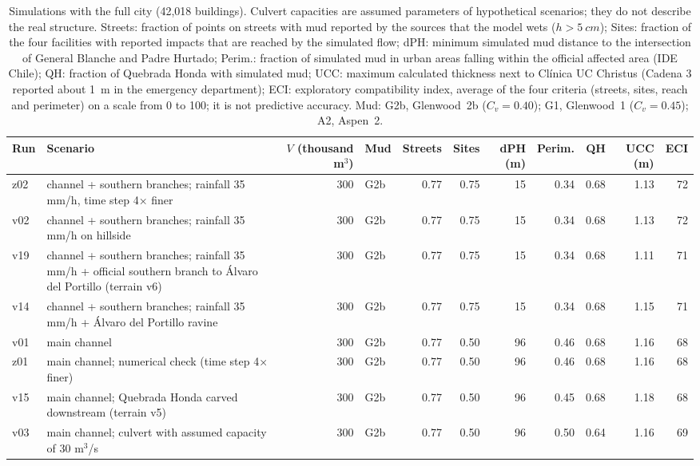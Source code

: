 \begin{table}[htbp]\centering\small
\caption{Simulations with the full city (42,018 buildings). Culvert capacities are assumed parameters of hypothetical scenarios; they do not describe the real structure. Streets: fraction of points on streets with mud reported by the sources that the model wets ($h>\SI{5}{cm}$); Sites: fraction of the four facilities with reported impacts that are reached by the simulated flow; dPH: minimum simulated mud distance to the intersection of General Blanche and Padre Hurtado; Perim.: fraction of simulated mud in urban areas falling within the official affected area (IDE Chile); QH: fraction of Quebrada Honda with simulated mud; UCC: maximum calculated thickness next to Clínica UC Christus (Cadena 3 reported about \SI{1}{m} in the emergency department); ECI: exploratory compatibility index, average of the four criteria (streets, sites, reach and perimeter) on a scale from 0 to 100; it is not predictive accuracy. Mud: G2b, Glenwood~2b ($C_v=0.40$); G1, Glenwood~1 ($C_v=0.45$); A2, Aspen~2.}\label{tab:v4}
{\setlength{\tabcolsep}{3.5pt}\begin{adjustbox}{max width=\textwidth}\begin{tabular}{llrlrrrrrrr}\toprule
Run & Scenario & $V$ (thousand m$^3$) & Mud & Streets & Sites & dPH (m) & Perim. & QH & UCC (m) & ECI\\
\midrule
z02 & channel + southern branches; rainfall 35 mm/h, time step 4× finer & 300 & G2b & 0.77 & 0.75 & 15 & 0.34 & 0.68 & 1.13 & 72\\
v02 & channel + southern branches; rainfall 35 mm/h on hillside & 300 & G2b & 0.77 & 0.75 & 15 & 0.34 & 0.68 & 1.13 & 72\\
v19 & channel + southern branches; rainfall 35 mm/h + official southern branch to Álvaro del Portillo (terrain v6) & 300 & G2b & 0.77 & 0.75 & 15 & 0.34 & 0.68 & 1.11 & 71\\
v14 & channel + southern branches; rainfall 35 mm/h + Álvaro del Portillo ravine & 300 & G2b & 0.77 & 0.75 & 15 & 0.34 & 0.68 & 1.15 & 71\\
v01 & main channel & 300 & G2b & 0.77 & 0.50 & 96 & 0.46 & 0.68 & 1.16 & 68\\
z01 & main channel; numerical check (time step 4× finer) & 300 & G2b & 0.77 & 0.50 & 96 & 0.46 & 0.68 & 1.16 & 68\\
v15 & main channel; Quebrada Honda carved downstream (terrain v5) & 300 & G2b & 0.77 & 0.50 & 96 & 0.45 & 0.68 & 1.18 & 68\\
v03 & main channel; culvert with assumed capacity of 30 m$^3$/s & 300 & G2b & 0.77 & 0.50 & 96 & 0.50 & 0.64 & 1.16 & 69\\

\end{tabular}
\end{adjustbox}}
\end{table}
